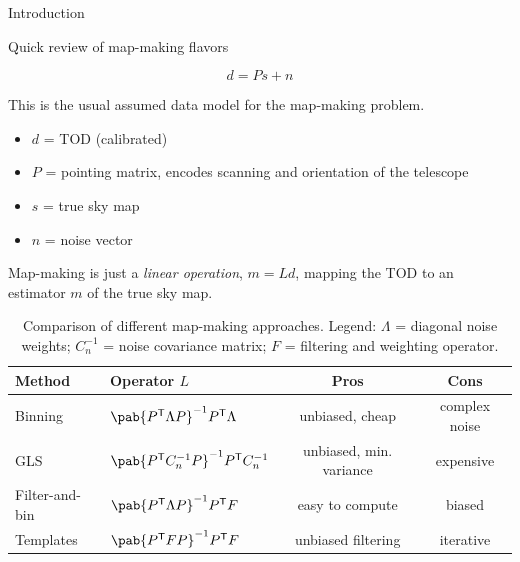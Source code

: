 \documentclass[final]{beamer}
\newcommand{\transpose}[1]{\ensuremath{#1^{\mathsf T}}}
\newlength{\colwidth}
\begin{document}
\begin{frame}[t]
\begin{columns}[t]
\begin{column}{\colwidth}
\begin{block}{Introduction}
      \end{block}

      \begin{alertblock}{Quick review of map-making flavors}


        \begin{equation}\label{eq:data_model}
          d = P s + n
        \end{equation}

        This is the usual assumed data model for the map-making problem.

        \begin{itemize}
          \item $d$ = TOD (calibrated)
          \item $P$ = pointing matrix, encodes scanning and orientation of the telescope
          \item $s$ = true sky map
          \item $n$ = noise vector
        \end{itemize}

        Map-making is just a \emph{linear operation}, $m = Ld$, mapping the TOD to an estimator $m$ of the true sky map.

        \begin{table}
          \centering
          \begin{tabular}{l l c c}
            \toprule
            \textbf{Method} & \textbf{Operator} $L$                                            & \textbf{Pros}           & \textbf{Cons} \\
            \midrule
            Binning         & \( \pab{\transpose{P} \Lambda P}^{-1} \transpose{P} \Lambda \)   & unbiased, cheap         & complex noise \\
            \midrule
            GLS             & \( \pab{\transpose{P} C_n^{-1} P}^{-1} \transpose{P} C_n^{-1} \) & unbiased, min. variance & expensive     \\
            \midrule
            Filter-and-bin  & \( \pab{\transpose{P} {\Lambda P}}^{-1} \transpose{P} F \)       & easy to compute         & biased        \\
            \midrule
            Templates       & \( \pab{\transpose{P} F P}^{-1} \transpose{P} F \)               & unbiased filtering      & iterative     \\
            \bottomrule
          \end{tabular}
          \caption{Comparison of different map-making approaches. Legend: $\Lambda$ = diagonal noise weights; $C_n^{-1}$ = noise covariance matrix; $F$ = filtering and weighting operator.}
        \end{table}


\end{alertblock}
\end{column}
\end{columns}
\end{frame}
\end{document}
